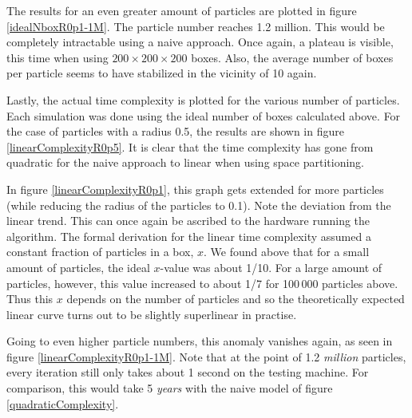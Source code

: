 The results for an even greater amount of particles are plotted in figure 
\ref{idealNboxR0p1-1M}. The particle number reaches 1.2 million. This would 
be completely intractable using a naive approach. Once again, a plateau is 
visible, this time when using $200 \times 200 \times 200$ boxes. Also, the 
average number of boxes per particle seems to have stabilized in the 
vicinity of 10 again.



Lastly, the actual time complexity is plotted for the various number of 
particles. Each simulation was done using the ideal number of boxes 
calculated above. For the case of particles with a radius 0.5, the results 
are shown in figure \ref{linearComplexityR0p5}. It is clear that the time 
complexity has gone from quadratic for the naive approach to linear when 
using space partitioning.




In figure \ref{linearComplexityR0p1}, this graph gets extended for more 
particles (while reducing the radius of the particles to 0.1). Note the 
deviation from the linear trend. This can once again be ascribed to the 
hardware running the algorithm. The formal derivation for the linear time 
complexity assumed a constant fraction of particles in a box, $x$. We found 
above that for a small amount of particles, the ideal $x$-value was about 1/10.  
For a large amount of particles, however, this value increased to about 1/7 for 
100\,000 particles above. Thus this $x$ depends on the number of particles and 
so the theoretically expected linear curve turns out to be slightly superlinear 
in practise.

Going to even higher particle numbers, this anomaly vanishes again, as seen in 
figure \ref{linearComplexityR0p1-1M}. Note that at the point of 1.2 
\emph{million} particles, every iteration still only takes about 1 second on 
the testing machine. For comparison, this would take 5 \emph{years} with the 
naive model of figure \ref{quadraticComplexity}.

